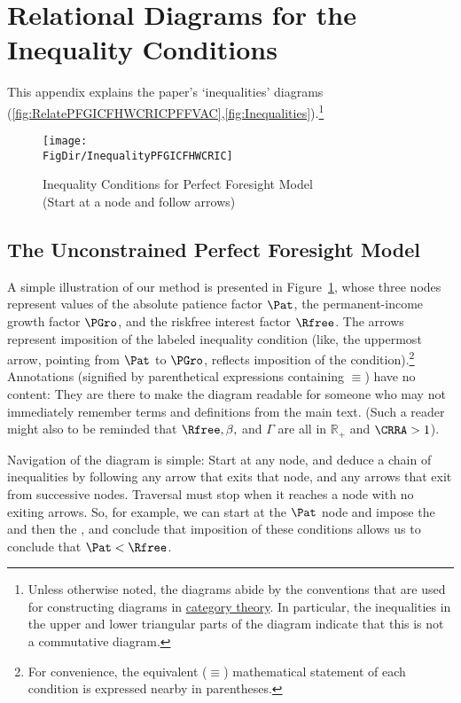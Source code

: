 \documentclass[\econtexRoot/BufferStockTheory]{subfiles}
\begin{document}
\label{sec:ApndxConditionDiagrams}
\hypertarget{ApndxConditionDiagrams}{}
\section{Relational Diagrams for the Inequality Conditions}

This appendix explains the paper's `inequalities' diagrams (\ref{fig:RelatePFGICFHWCRICPFFVAC},\ref{fig:Inequalities}).\footnote{Unless otherwise noted, the diagrams abide by the conventions that are used for constructing diagrams in \href{https://en.wikipedia.org/wiki/Diagram_(category_theory)}{category theory}.  In particular, the inequalities in the upper and lower triangular parts of the diagram indicate that this is not a commutative diagram.}

\hypertarget{InequalityPFGICFHWCRIC}{}
\begin{figure}
\centering
\texttt{[image: \\FigDir/InequalityPFGICFHWCRIC]}
\caption{Inequality Conditions for Perfect Foresight Model \\ (Start at a node and follow arrows)}
\label{fig:InequalityPFGICFHWCRIC}
\end{figure}

\subsection{The Unconstrained Perfect Foresight Model}

A simple illustration of our method is presented in Figure~\ref{fig:InequalityPFGICFHWCRIC}, whose three nodes represent values of the absolute patience factor $\Pat$, the permanent-income growth factor $\PGro$, and the riskfree interest factor $\Rfree$.  The arrows represent imposition of the labeled inequality condition  (like,  the uppermost arrow, pointing from {$\Pat$} to $\PGro$, reflects imposition of the {\PFGIC} condition).\footnote{For convenience, the equivalent ($\equiv$) mathematical statement of each condition is expressed nearby in parentheses.}  Annotations (signified by parenthetical expressions containing $\equiv$) have no content: They are there to make the diagram readable for someone who may not immediately remember terms and definitions from the main text.  (Such a reader might also to be reminded that $\Rfree, \beta, $ and $\Gamma$ are all in $\mathbb{R}_{+}$ and $\CRRA>1$).

Navigation of the diagram is simple: Start at any node, and deduce a chain of inequalities by following any arrow that exits that node, and any arrows that exit from successive nodes.  Traversal must stop when it reaches a node with no exiting arrows.  So, for example, we can start at the $\Pat$ node and impose the {\PFGIC} and then the {\FHWC}, and conclude that imposition of these conditions allows us to conclude that $\Pat < \Rfree$.
\end{document}
